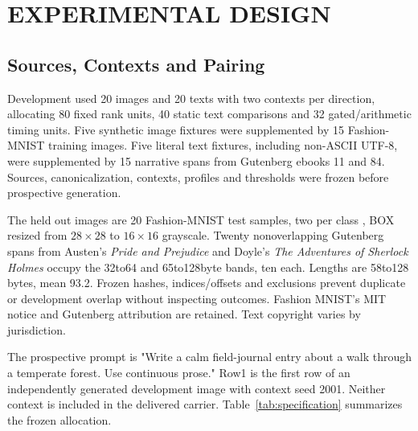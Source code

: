 \documentclass[a4paper,twoside]{article}
\begin{document}
\section{\uppercase{Experimental Design}}
\label{sec:design}
\subsection{Sources, Contexts and Pairing}
Development used 20 images and 20 texts with two contexts per direction, allocating 80 fixed rank units, 40 static text comparisons and 32 gated/arithmetic timing units. Five synthetic image fixtures were supplemented by 15 Fashion-MNIST training images. Five literal text fixtures, including non-ASCII UTF-8, were supplemented by 15 narrative spans from Gutenberg ebooks 11 and 84. Sources, canonicalization, contexts, profiles and thresholds were frozen before prospective generation.

The held out images are 20 Fashion-MNIST test samples, two per class \cite{fashion}, BOX resized from $28\times28$ to $16\times16$ grayscale. Twenty nonoverlapping Gutenberg spans from Austen's \emph{Pride and Prejudice} and Doyle's \emph{The Adventures of Sherlock Holmes} occupy the 32to64 and 65to128byte bands, ten each. Lengths are 58to128 bytes, mean 93.2. Frozen hashes, indices/offsets and exclusions prevent duplicate or development overlap without inspecting outcomes. Fashion MNIST's MIT notice and Gutenberg attribution are retained. Text copyright varies by jurisdiction.

The prospective prompt is "Write a calm field-journal entry about a walk through a temperate forest. Use continuous prose." Row1 is the first row of an independently generated development image with context seed 2001. Neither context is included in the delivered carrier. Table~\ref{tab:specification} summarizes the frozen allocation.
\end{document}
